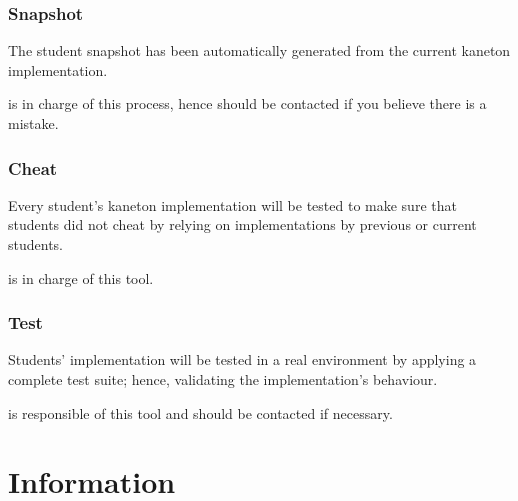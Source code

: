 
\begin{frame}
  \frametitle{Snapshot}

  The student snapshot has been automatically generated from the current
  kaneton implementation.

  \-

   is in charge of this process, hence should be
  contacted if you believe there is a mistake.
\end{frame}


\begin{frame}
  \frametitle{Cheat}

  Every student's kaneton implementation will be tested to make sure that
  students did not cheat by relying on implementations by previous or
  current students.

  \-

   is in charge of this tool.
\end{frame}


\begin{frame}
  \frametitle{Test}

  Students' implementation will be tested in a real environment by applying
  a complete test suite; hence, validating the implementation's behaviour.

  \-

   is responsible of this tool and should be contacted
  if necessary.
\end{frame}

%
%

\section{Information}


